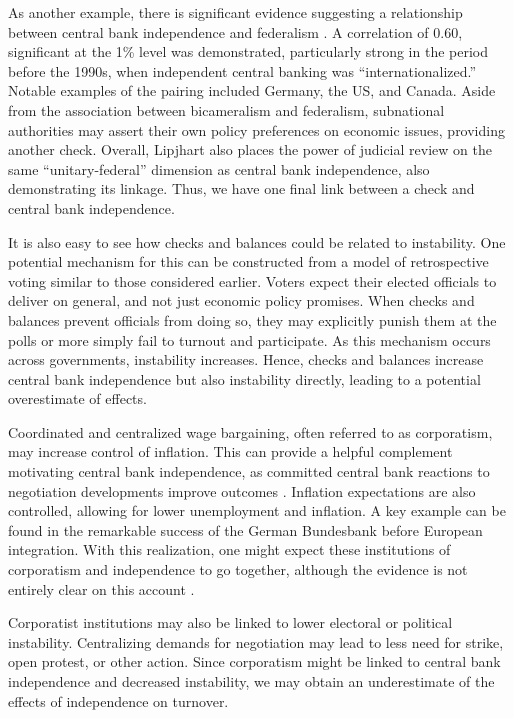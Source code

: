 \documentclass{article}
\begin{document}
    As another example, there is significant evidence suggesting a relationship between central bank independence and federalism \citep{lijphart_patterns_2012}. A correlation of 0.60, significant at the 1\% level was demonstrated, particularly strong in the period before the 1990s, when independent central banking was “internationalized.” Notable examples of the pairing included Germany, the US, and Canada. Aside from the association between bicameralism and federalism, subnational authorities may assert their own policy preferences on economic issues, providing another check. Overall, Lipjhart also places the power of judicial review on the same “unitary-federal” dimension as central bank independence, also demonstrating its linkage. Thus, we have one final link between a check and central bank independence.
   
    It is also easy to see how checks and balances could be related to instability. One potential mechanism for this can be constructed from a model of retrospective voting similar to those considered earlier. Voters expect their elected officials to deliver on general, and not just economic policy promises. When checks and balances prevent officials from doing so, they may explicitly punish them at the polls or more simply fail to turnout and participate. As this mechanism occurs across governments, instability increases. Hence, checks and balances increase central bank independence but also instability directly, leading to a potential overestimate of effects.
   
    Coordinated and centralized wage bargaining, often referred to as corporatism, may increase control of inflation. This can provide a helpful complement motivating central bank independence, as committed central bank reactions to negotiation developments improve outcomes \citep{hall_mixed_1998}. Inflation expectations are also controlled, allowing for lower unemployment and inflation. A key example can be found in the remarkable success of the German Bundesbank before European integration. With this realization, one might expect these institutions of corporatism and independence to go together, although the evidence is not entirely clear on this account \citep{lijphart_patterns_2012}.
   
    Corporatist institutions may also be linked to lower electoral or political instability. Centralizing demands for negotiation may lead to less need for strike, open protest, or other action. Since corporatism might be linked to central bank independence and decreased instability, we may obtain an underestimate of the effects of independence on turnover.
   
\end{document}
